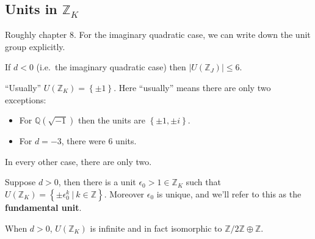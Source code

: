 \hypertarget{units-in-mathbbz_k}{%
\subsection{\texorpdfstring{Units in
\({\mathbb{Z}}_K\)}{Units in \{\textbackslash mathbb\{Z\}\}\_K}}\label{units-in-mathbbz_k}}

\begin{remark}

Roughly chapter 8. For the imaginary quadratic case, we can write down
the unit group explicitly.

\end{remark}

\begin{proposition}

If \(d<0\) (i.e.~the imaginary quadratic case) then
\({\left\lvert { U({\mathbb{Z}}_J)} \right\rvert} \leq 6\).

\end{proposition}

\begin{remark}

``Usually'' \(U({\mathbb{Z}}_K) = \left\{{ \pm 1 }\right\}\). Here
``usually'' means there are only two exceptions:

\begin{itemize}
\item
  For \({\mathbb{Q}}( \sqrt{-1} )\) then the units are
  \(\left\{{ \pm 1, \pm i }\right\}\).
\item
  For \(d=-3\), there were 6 units.
\end{itemize}

In every other case, there are only two.

\end{remark}

\begin{proposition}

Suppose \(d>0\), then there is a unit
\(\epsilon_0 > 1 \in {\mathbb{Z}}_K\) such that
\(U({\mathbb{Z}}_K) = \left\{{ \pm \epsilon_0 ^k {~\mathrel{\Big|}~}k\in {\mathbb{Z}}}\right\}\).
Moreover \(\epsilon_0\) is unique, and we'll refer to this as the
\textbf{fundamental unit}.

\end{proposition}

\begin{corollary}

When \(d>0\), \(U({\mathbb{Z}}_K)\) is infinite and in fact isomorphic
to \({\mathbb{Z}}/2{\mathbb{Z}}\oplus {\mathbb{Z}}\).

\end{corollary}


